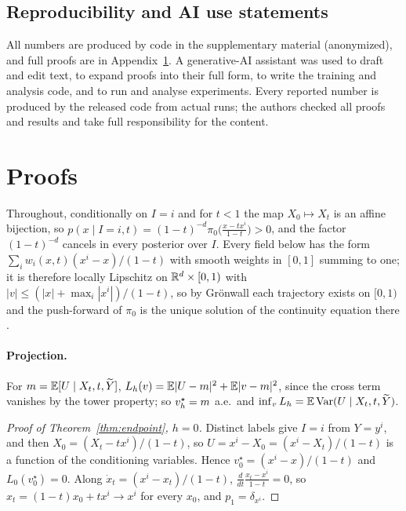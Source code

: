 \documentclass{article}
\theoremstyle{plain}
\theoremstyle{remark}
\begin{document}
\label{endmain}
\subsection*{Reproducibility and AI use statements}
All numbers are produced by code in the supplementary material (anonymized), and full
proofs are in Appendix~\ref{app:proofs}. A generative-AI assistant was used to draft and
edit text, to expand proofs into their full form, to write the training and analysis
code, and to run and analyse experiments. Every reported number is produced by the
released code from actual runs; the authors checked all proofs and results and take full
responsibility for the content.




\appendix
\section{Proofs}
\label{app:proofs}

Throughout, conditionally on $I=i$ and for $t<1$ the map $X_0\mapsto X_t$ is an affine
bijection, so $p(x\mid I=i,t)=(1-t)^{-d}\pi_0\big(\tfrac{x-tx^i}{1-t}\big)>0$, and the
factor $(1-t)^{-d}$ cancels in every posterior over $I$. Every field below has the form
$\sum_iw_i(x,t)(x^i-x)/(1-t)$ with smooth weights in $[0,1]$ summing to one; it is
therefore locally Lipschitz on $\mathbb{R}^d\times[0,1)$ with $|v|\le(|x|+\max_i|x^i|)/(1-t)$,
so by Gr\"onwall each trajectory exists on $[0,1)$ and the push-forward of $\pi_0$ is the
unique solution of the continuity equation there \citep[Ch.~8]{ambrosio2008gradient}.

\paragraph{Projection.} For $m=\mathbb{E}[U\mid X_t,t,\widetilde Y]$,
$L_h(v)=\mathbb{E}|U-m|^2+\mathbb{E}|v-m|^2$, since the cross term vanishes by the tower property; so
$v_h^\star=m$ a.e.\ and $\inf_vL_h=\mathbb{E}\operatorname{Var}(U\mid X_t,t,\widetilde Y)$.

\begin{proof}[Proof of Theorem~\ref{thm:endpoint}, $h=0$]
Distinct labels give $I=i$ from $Y=y^i$, and then $X_0=(X_t-tx^i)/(1-t)$, so
$U=x^i-X_0=(x^i-X_t)/(1-t)$ is a function of the conditioning variables. Hence
$v_0^\star=(x^i-x)/(1-t)$ and $L_0(v_0^\star)=0$. Along
$\dot x_t=(x^i-x_t)/(1-t)$, $\frac{d}{dt}\frac{x_t-x^i}{1-t}=0$, so
$x_t=(1-t)x_0+tx^i\to x^i$ for every $x_0$, and $p_1=\delta_{x^i}$.
\end{proof}
\end{document}
